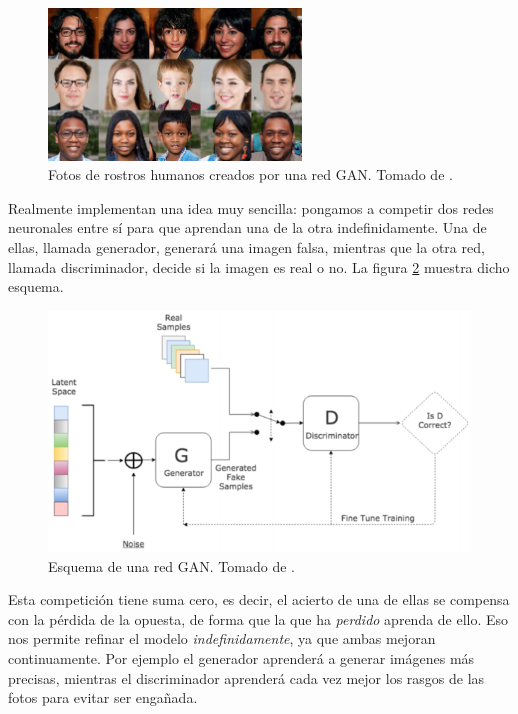 \documentclass[../main.tex]{subfiles}
\begin{document}
\begin{figure}[h]
    \centering
    \includegraphics[width=0.6\textwidth]{imagenes/caras gan.png}
    \caption[Fotos de rostros humanos creados por una red GAN]{Fotos de rostros humanos creados por una red GAN. Tomado de \cite{Zavia2018}.}
    \label{fig:imagenes_gan}
\end{figure}

Realmente implementan una idea muy sencilla: pongamos a competir dos redes neuronales entre sí para que aprendan una de la otra indefinidamente. Una de ellas, llamada generador, generará una imagen falsa, mientras que la otra red, llamada discriminador, decide si la imagen es real o no. La figura \ref{fig:esquema_gan} muestra dicho esquema.

\begin{figure}[h]
    \centering
    \includegraphics[width=1\textwidth]{imagenes/esquema gan.png}
    \caption[Esquema de una red GAN]{Esquema de una red GAN. Tomado de \cite{R.VIllatoro2018}.}
    \label{fig:esquema_gan}
\end{figure}

Esta competición tiene suma cero, es decir, el acierto de una de ellas se compensa con la pérdida de la opuesta, de forma que la que ha \textit{perdido} aprenda de ello. Eso nos permite refinar el modelo \textit{indefinidamente}, ya que ambas mejoran continuamente. Por ejemplo el generador aprenderá a generar imágenes más precisas, mientras el discriminador aprenderá cada vez mejor los rasgos de las fotos para evitar ser engañada.
\end{document}
